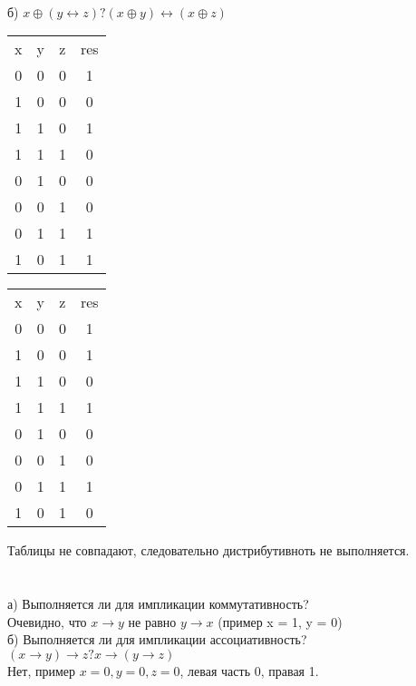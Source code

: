 \documentclass{article}
\begin{document}
\\
б) $x\oplus (y \leftrightarrow z) ? (x \oplus y) \leftrightarrow (x \oplus z)$
\begin{center}
\begin{tabular}{ |c|c|c|c| } 
 \hline
 x & y & z & res \\
 0 & 0 & 0 & 1 \\ 
 1 & 0 & 0 & 0 \\ 
 1 & 1 & 0 & 1 \\ 
 1 & 1 & 1 & 0 \\ 
 0 & 1 & 0 & 0 \\ 
 0 & 0 & 1 & 0 \\ 
 0 & 1 & 1 & 1 \\
 1 & 0 & 1 & 1 \\
 \hline
\end{tabular}
\begin{tabular}{ |c|c|c|c| } 
 \hline
 x & y & z & res \\
 0 & 0 & 0 & 1 \\ 
 1 & 0 & 0 & 1 \\ 
 1 & 1 & 0 & 0 \\ 
 1 & 1 & 1 & 1 \\ 
 0 & 1 & 0 & 0 \\ 
 0 & 0 & 1 & 0 \\ 
 0 & 1 & 1 & 1 \\
 1 & 0 & 1 & 0 \\
 \hline
\end{tabular}
\end{center}
Таблицы не совпадают, следовательно дистрибутивноть не выполняется.\\
\section{}
а) Выполняется ли для импликации коммутативность?\\
Очевидно, что $x \rightarrow y$ не равно $y \rightarrow x$ (пример x = 1, y = 0)\\
б) Выполняется ли для импликации ассоциативность?\\
$(x\rightarrow y) \rightarrow z ? x \rightarrow (y \rightarrow z)$\\
Нет, пример $x=0, y=0, z=0$, левая часть 0, правая 1.\\
\end{document}
